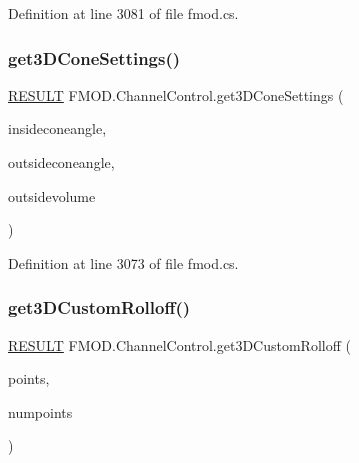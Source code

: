Definition at line 3081 of file fmod.\+cs.

\mbox{\label{class_f_m_o_d_1_1_channel_control_a98b5a71f36cb75c08f0788129c694e63}} 
\subsubsection{\texorpdfstring{get3\+D\+Cone\+Settings()}{get3DConeSettings()}}
{\footnotesize\ttfamily \hyperlink{namespace_f_m_o_d_a305d1176ef3f8c8815861a60407ac33d}{R\+E\+S\+U\+LT} F\+M\+O\+D.\+Channel\+Control.\+get3\+D\+Cone\+Settings (\begin{DoxyParamCaption}\item[{out float}]{insideconeangle,  }\item[{out float}]{outsideconeangle,  }\item[{out float}]{outsidevolume }\end{DoxyParamCaption})}



Definition at line 3073 of file fmod.\+cs.

\mbox{\label{class_f_m_o_d_1_1_channel_control_a76cbd7d34b6864e7490ad96571c07c10}} 
\subsubsection{\texorpdfstring{get3\+D\+Custom\+Rolloff()}{get3DCustomRolloff()}}
{\footnotesize\ttfamily \hyperlink{namespace_f_m_o_d_a305d1176ef3f8c8815861a60407ac33d}{R\+E\+S\+U\+LT} F\+M\+O\+D.\+Channel\+Control.\+get3\+D\+Custom\+Rolloff (\begin{DoxyParamCaption}\item[{out Int\+Ptr}]{points,  }\item[{out int}]{numpoints }\end{DoxyParamCaption})}



